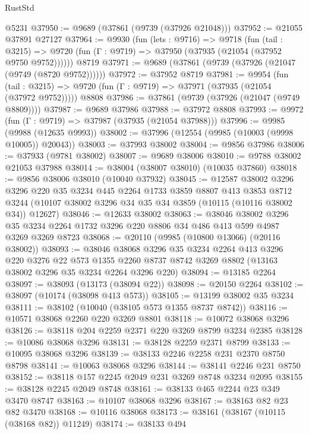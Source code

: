 \begin{lexlean}{RustStd}
\begin{coremodule}
    @5231
@37950 := @9689 (@37861 (@9739 (@37926 @21048)))
@37952 := @21055 @37891 @27127
@37964 := @9930
    (fun (lets : @9716) =>
    @9718
      (fun (tail : @3215) =>
      @9720 (fun (Γ : @9719) => @37950 (@37935 (@21054 (@37952 @9750 @9752))))))
    @8719
@37971 := @9689 (@37861 (@9739 (@37926 (@21047 (@9749 (@8720 @9752))))))
@37972 := @37952 @8719
@37981 := @9954
    (fun (tail : @3215) => @9720 (fun (Γ : @9719) => @37971 (@37935 (@21054 (@37972 @9752)))))
    @8808
@37986 := @37861 (@9739 (@37926 (@21047 (@9749 @8809))))
@37987 := @9689 @37986
@37988 := @37972 @8808
@37993 := @9972 (fun (Γ : @9719) => @37987 (@37935 (@21054 @37988)))
@37996 := @9985 (@9988 (@12635 @9993))
@38002 := @37996 (@12554 (@9985 (@10003 (@9998 @10005)) @20043))
@38003 := @37993 @38002
@38004 := @9856 @37986
@38006 := @37933 (@9781 @38002)
@38007 := @9689 @38006
@38010 := @9788 @38002 @21053 @37988
@38014 := @38004 (@38007 @38010) (@10035 @37860)
@38018 := @9856 @38006 @38010 (@10040 @37932)
@38045 := @12587
    @38002
    @3296
    @3296
    @220
    @35
    @3234
    @445
    @2264
    @1733
    @3859
    @8807
    @413
    @3853
    @8712
    @3244
    (@10107 @38002 @3296 @34 @35 @34 @3859 (@10115 (@10116 @38002 @34)) @12627)
@38046 := @12633 @38002
@38063 := @38046
    @38002
    @3296
    @35
    @3234
    @2264
    @1732
    @3296
    @220
    @8806
    @34
    @486
    @413
    @599
    @4987
    @3269
    @3269
    @8723
@38068 := @20110 (@9985 (@10800 @13066) (@20116 @38002))
@38093 := @38046
    @38068
    @3296
    @35
    @3234
    @2264
    @413
    @3296
    @220
    @3276
    @22
    @573
    @1355
    @2260
    @8737
    @8742
    @3269
    @8802
    (@13163 @38002 @3296 @35 @3234 @2264 @3296 @220)
@38094 := @13185 @2264
@38097 := @38093 (@13173 (@38094 @22))
@38098 := @20150 @2264
@38102 := @38097 (@10174 (@38098 @413 @573))
@38105 := @13199 @38002 @35 @3234
@38111 := @38102 (@10040 (@38105 @573 @1355 @8737 @8742))
@38116 := @10571 @38068 @2260 @220 @3269 @8801
@38118 := @10072 @38068 @3296
@38126 := @38118 @204 @2259 @2371 @220 @3269 @8799 @3234 @2385
@38128 := @10086 @38068 @3296
@38131 := @38128 @2259 @2371 @8799
@38133 := @10095 @38068 @3296
@38139 := @38133 @2246 @2258 @231 @2370 @8750 @8798
@38141 := @10063 @38068 @3296
@38144 := @38141 @2246 @231 @8750
@38152 := @38118 @157 @2245 @2049 @231 @3269 @8748 @3234 @2095
@38155 := @38128 @2245 @2049 @8748
@38161 := @38133 @465 @2244 @23 @349 @3470 @8747
@38163 := @10107 @38068 @3296
@38167 := @38163 @82 @23 @82 @3470
@38168 := @10116 @38068
@38173 := @38161 (@38167 (@10115 (@38168 @82)) @11249)
@38174 := @38133 @494

\end{coremodule}
\end{lexlean}

